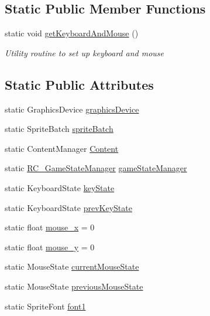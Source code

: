 \subsection*{Static Public Member Functions}
\begin{DoxyCompactItemize}
\item 
static void \mbox{\hyperlink{class_r_c___framework_1_1_r_c___game_state_parent_a97c7dff53d0c3543e8ea01fcdb2cd1de}{get\+Keyboard\+And\+Mouse}} ()
\begin{DoxyCompactList}\small\item\em Utility routine to set up keyboard and mouse \end{DoxyCompactList}\end{DoxyCompactItemize}
\subsection*{Static Public Attributes}
\begin{DoxyCompactItemize}
\item 
static Graphics\+Device \mbox{\hyperlink{class_r_c___framework_1_1_r_c___game_state_parent_afd2f2ef0999c284adc241563b5c6314a}{graphics\+Device}}
\item 
static Sprite\+Batch \mbox{\hyperlink{class_r_c___framework_1_1_r_c___game_state_parent_a53d22435d3ccf01092a06e83873a9eeb}{sprite\+Batch}}
\item 
static Content\+Manager \mbox{\hyperlink{class_r_c___framework_1_1_r_c___game_state_parent_a772dfa1ba0878142104adfc3eae559e5}{Content}}
\item 
static \mbox{\hyperlink{class_r_c___framework_1_1_r_c___game_state_manager}{R\+C\+\_\+\+Game\+State\+Manager}} \mbox{\hyperlink{class_r_c___framework_1_1_r_c___game_state_parent_a3511187c06d875b45ff212506147cb3d}{game\+State\+Manager}}
\item 
static Keyboard\+State \mbox{\hyperlink{class_r_c___framework_1_1_r_c___game_state_parent_ad06a8d6e2406a9dc1d8300c8dc71f29a}{key\+State}}
\item 
static Keyboard\+State \mbox{\hyperlink{class_r_c___framework_1_1_r_c___game_state_parent_a55d41a359519fd898e465887b452063d}{prev\+Key\+State}}
\item 
static float \mbox{\hyperlink{class_r_c___framework_1_1_r_c___game_state_parent_af534866f8d4fa277ffacce36c161da65}{mouse\+\_\+x}} = 0
\item 
static float \mbox{\hyperlink{class_r_c___framework_1_1_r_c___game_state_parent_ac8ccd45ec22dd583f59d8d21663abe97}{mouse\+\_\+y}} = 0
\item 
static Mouse\+State \mbox{\hyperlink{class_r_c___framework_1_1_r_c___game_state_parent_a4009cee63013baddd6c472493878c631}{current\+Mouse\+State}}
\item 
static Mouse\+State \mbox{\hyperlink{class_r_c___framework_1_1_r_c___game_state_parent_a867cec9b3490d334194932d82e5ea6c0}{previous\+Mouse\+State}}
\item 
static Sprite\+Font \mbox{\hyperlink{class_r_c___framework_1_1_r_c___game_state_parent_a0e2ab0c92858466e1628dc79ef237a8b}{font1}}
\end{DoxyCompactItemize}


